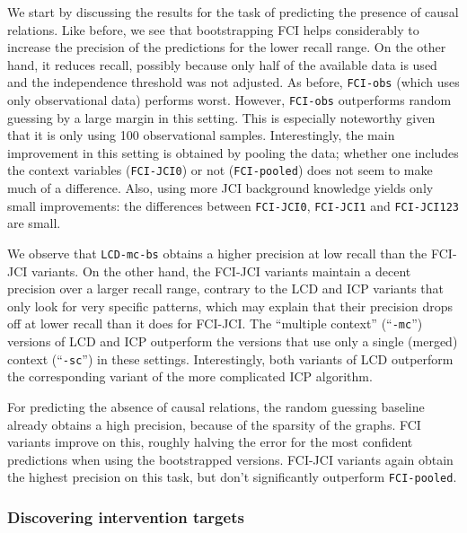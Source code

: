\documentclass[twoside,11pt]{article}
\newcommand{\alg}[1]{\texttt{#1}}
\begin{document}
We start by discussing the results for the task of predicting the presence of causal relations.
Like before, we see that bootstrapping FCI helps considerably to increase the precision of the predictions
for the lower recall range. On the other hand, it reduces recall, possibly because only
half of the available data is used and the independence threshold was not adjusted.
As before, \alg{FCI-obs} (which uses only observational data) performs worst.
However, \alg{FCI-obs} outperforms random guessing by a large margin in this setting. 
This is especially noteworthy given that it is only using 100 observational samples. 
Interestingly, the main improvement in this setting is obtained by pooling the data;
whether one includes the context variables (\alg{FCI-JCI0}) or not (\alg{FCI-pooled})
does not seem to make much of a difference.
Also, using more JCI background knowledge yields only small improvements: the differences
between \alg{FCI-JCI0}, \alg{FCI-JCI1} and \alg{FCI-JCI123} are small.

We observe that \alg{LCD-mc-bs} obtains a higher precision at low recall than the FCI-JCI variants. 
On the other hand, the FCI-JCI variants maintain a decent precision over a larger recall range, contrary
to the LCD and ICP variants that only look for very specific patterns, which may explain that their
precision drops off at lower recall than it does for FCI-JCI. The ``multiple context'' (``\alg{-mc}'') 
versions of LCD and ICP outperform the versions that use only a single (merged) context 
(``\alg{-sc}'') in these settings. Interestingly, both variants of LCD outperform the 
corresponding variant of the more complicated ICP algorithm.

For predicting the absence of causal relations, the random guessing baseline already obtains
a high precision, because of the sparsity of the graphs. FCI variants improve on this, roughly
halving the error for the most confident predictions when using the bootstrapped versions. 
FCI-JCI variants again obtain the highest precision on this task, but don't significantly outperform \alg{FCI-pooled}.

\subsubsection{Discovering intervention targets}
\end{document}
